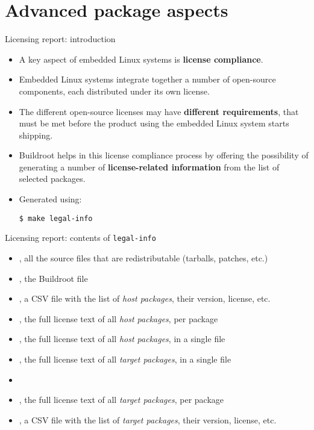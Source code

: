 \section{Advanced package aspects}

\begin{frame}[fragile]{Licensing report: introduction}
  \begin{itemize}
  \item A key aspect of embedded Linux systems is {\bf license
      compliance}.
  \item Embedded Linux systems integrate together a number of
    open-source components, each distributed under its own license.
  \item The different open-source licenses may have {\bf different
      requirements}, that must be met before the product using the
    embedded Linux system starts shipping.
  \item Buildroot helps in this license compliance process by offering
    the possibility of generating a number of {\bf license-related
      information} from the list of selected packages.
  \item Generated using:
\begin{block}{}
\begin{verbatim}
$ make legal-info
\end{verbatim}
\end{block}
  \end{itemize}
\end{frame}

\begin{frame}{Licensing report: contents of {\tt legal-info}}
  \begin{itemize}
  \item {}, all the source files that are redistributable
    (tarballs, patches, etc.)
  \item {}, the Buildroot  file
  \item {}, a CSV file with the list of {\em
      host packages}, their version, license, etc.
  \item {}, the full license text of all {\em
      host packages}, per package
  \item {}, the full license text of all {\em
      host packages}, in a single file
  \item {}, the full license text of all {\em target
      packages}, in a single file
  \item {}
  \item {}, the full license text of all {\em target
      packages}, per package
  \item {}, a CSV file with the list of {\em target
      packages}, their version, license, etc.
  \end{itemize}
\end{frame}

